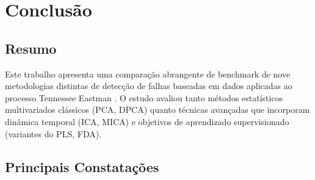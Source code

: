 \documentclass[journal]{IEEEtran}
\begin{document}

\section{Conclusão}
\label{sec:conclusion}

\subsection{Resumo}
\label{subsec:summary}

Este trabalho apresenta uma comparação abrangente de benchmark de nove metodologias distintas de detecção de falhas baseadas em dados aplicadas ao processo Tennessee Eastman \cite{downs_and_vogel_1993, germano2016, yin2012}. O estudo avaliou tanto métodos estatísticos multivariados clássicos (PCA, DPCA) \cite{favoreel2000} quanto técnicas avançadas que incorporam dinâmica temporal (ICA, MICA) e objetivos de aprendizado supervisionado (variantes do PLS, FDA).

\subsection{Principais Constatações}
\label{subsec:key_findings}
\end{document}
